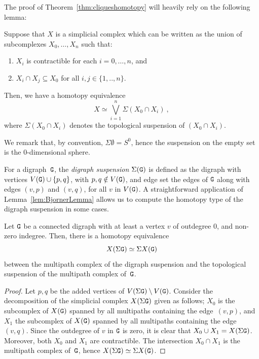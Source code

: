 \documentclass{amsart}
\begin{document}
The proof of  Theorem~\ref{thm:cliqueshomotopy} will heavily rely on the following lemma:


\begin{lem}\label{lem:BjornerLemma}
Suppose that $X$ is a simplicial complex which can be written as the union of subcomplexes $X_{0},\dots, X_{n}$ such that:
\begin{enumerate}[label = (\alph*)]
\item $X_i$ is contractible for each $i= 0,\dots, n$, and
\item $X_i\cap X_j \subseteq X_0$ for all $i,j\in \{ 1,..,n\}$.
\end{enumerate}
Then, we have a homotopy equivalence
\[ X \simeq \bigvee_{i=1}^n \Sigma(X_{0} \cap X_{i}) \ ,\]
where $\Sigma(X_{0} \cap X_{i})$ denotes the topological suspension of $(X_{0} \cap X_{i})$.
\end{lem}

We remark that, by convention, $\Sigma \emptyset = S^{0} $, hence the suspension on the empty set is the $0$-dimensional sphere.


For a digraph~${\tt G}$, the \emph{digraph suspension} $\Sigma({\tt G})$ is defined as the digraph with vertices $V({\tt G})\cup \{p,q\}$, with $p,q\notin V({\tt G})$, and edge set the edges of ${\tt G}$ along with edges $(v,p)$ and $(v,q)$, for all $v$ in $V({\tt G})$.
A straightforward application of Lemma~\ref{lem:BjornerLemma} allows us to compute the homotopy type of the digraph suspension in some cases. %

\begin{prop}\label{prop:suspension}
Let ${\tt G}$ be a connected digraph with at least a vertex $v$ of outdegree $0$, and non-zero indegree. Then, there is a homotopy equivalence
\[
X(\Sigma{\tt G})\simeq \Sigma X({\tt G})
\]
between the multipath complex of the digraph suspension and the topological suspension of the multipath complex of~${\tt G}$.
\end{prop}

\begin{proof}
Let $p, q$ be the added vertices of $V(\Sigma{\tt G}) \setminus V({\tt G})$.
Consider the decomposition of the simplicial complex $X(\Sigma{\tt G})$ given as follows; $X_0$ is the subcomplex of $X({\tt G})$ spanned by all multipaths containing the edge~$(v,p)$, and $X_1$  the subcomplex of $X({\tt G})$ spanned by all multipaths containing the edge~$(v,q)$. Since the outdegree of $v$ in ${\tt G}$ is zero, it is clear that $X_0\cup X_1=X(\Sigma{\tt G})$. Moreover, both $X_0$ and $X_1$ are contractible. The intersection $X_0\cap X_1$ is the multipath complex of~${\tt G}$, hence $X(\Sigma{\tt G})\simeq \Sigma X({\tt G})$.
\end{proof}
\end{document}
